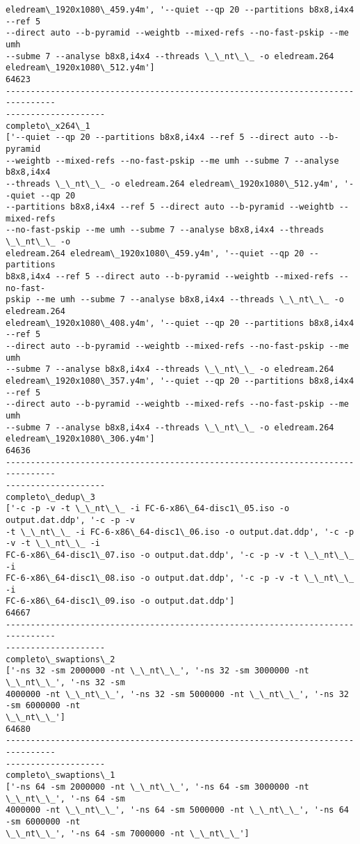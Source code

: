 \documentclass[11pt]{article}
\begin{document}
\begin{Verbatim}[commandchars=\\\{\}]
eledream\_1920x1080\_459.y4m', '--quiet --qp 20 --partitions b8x8,i4x4 --ref 5
--direct auto --b-pyramid --weightb --mixed-refs --no-fast-pskip --me umh
--subme 7 --analyse b8x8,i4x4 --threads \_\_nt\_\_ -o eledream.264
eledream\_1920x1080\_512.y4m']
64623
--------------------------------------------------------------------------------
--------------------
completo\_x264\_1
['--quiet --qp 20 --partitions b8x8,i4x4 --ref 5 --direct auto --b-pyramid
--weightb --mixed-refs --no-fast-pskip --me umh --subme 7 --analyse b8x8,i4x4
--threads \_\_nt\_\_ -o eledream.264 eledream\_1920x1080\_512.y4m', '--quiet --qp 20
--partitions b8x8,i4x4 --ref 5 --direct auto --b-pyramid --weightb --mixed-refs
--no-fast-pskip --me umh --subme 7 --analyse b8x8,i4x4 --threads \_\_nt\_\_ -o
eledream.264 eledream\_1920x1080\_459.y4m', '--quiet --qp 20 --partitions
b8x8,i4x4 --ref 5 --direct auto --b-pyramid --weightb --mixed-refs --no-fast-
pskip --me umh --subme 7 --analyse b8x8,i4x4 --threads \_\_nt\_\_ -o eledream.264
eledream\_1920x1080\_408.y4m', '--quiet --qp 20 --partitions b8x8,i4x4 --ref 5
--direct auto --b-pyramid --weightb --mixed-refs --no-fast-pskip --me umh
--subme 7 --analyse b8x8,i4x4 --threads \_\_nt\_\_ -o eledream.264
eledream\_1920x1080\_357.y4m', '--quiet --qp 20 --partitions b8x8,i4x4 --ref 5
--direct auto --b-pyramid --weightb --mixed-refs --no-fast-pskip --me umh
--subme 7 --analyse b8x8,i4x4 --threads \_\_nt\_\_ -o eledream.264
eledream\_1920x1080\_306.y4m']
64636
--------------------------------------------------------------------------------
--------------------
completo\_dedup\_3
['-c -p -v -t \_\_nt\_\_ -i FC-6-x86\_64-disc1\_05.iso -o output.dat.ddp', '-c -p -v
-t \_\_nt\_\_ -i FC-6-x86\_64-disc1\_06.iso -o output.dat.ddp', '-c -p -v -t \_\_nt\_\_ -i
FC-6-x86\_64-disc1\_07.iso -o output.dat.ddp', '-c -p -v -t \_\_nt\_\_ -i
FC-6-x86\_64-disc1\_08.iso -o output.dat.ddp', '-c -p -v -t \_\_nt\_\_ -i
FC-6-x86\_64-disc1\_09.iso -o output.dat.ddp']
64667
--------------------------------------------------------------------------------
--------------------
completo\_swaptions\_2
['-ns 32 -sm 2000000 -nt \_\_nt\_\_', '-ns 32 -sm 3000000 -nt \_\_nt\_\_', '-ns 32 -sm
4000000 -nt \_\_nt\_\_', '-ns 32 -sm 5000000 -nt \_\_nt\_\_', '-ns 32 -sm 6000000 -nt
\_\_nt\_\_']
64680
--------------------------------------------------------------------------------
--------------------
completo\_swaptions\_1
['-ns 64 -sm 2000000 -nt \_\_nt\_\_', '-ns 64 -sm 3000000 -nt \_\_nt\_\_', '-ns 64 -sm
4000000 -nt \_\_nt\_\_', '-ns 64 -sm 5000000 -nt \_\_nt\_\_', '-ns 64 -sm 6000000 -nt
\_\_nt\_\_', '-ns 64 -sm 7000000 -nt \_\_nt\_\_']

\end{Verbatim}
\end{document}
